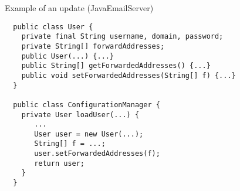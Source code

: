 \newcommand{\ExampleCodeSize}{footnotesize}
\begin{frame}[fragile,shrink=5]{Example of an update (JavaEmailServer)}%
\begin{\ExampleCodeSize}
\begin{verbatim}
  public class User {
    private final String username, domain, password;
    private String[] forwardAddresses;
    public User(...) {...}
    public String[] getForwardedAddresses() {...}
    public void setForwardedAddresses(String[] f) {...}
  }

  public class ConfigurationManager {
    private User loadUser(...) {
       ...
       User user = new User(...);
       String[] f = ...;
       user.setForwardedAddresses(f);
       return user;
    }
  }




\end{verbatim}
\end{\ExampleCodeSize}
\end{frame}

% 
% 

